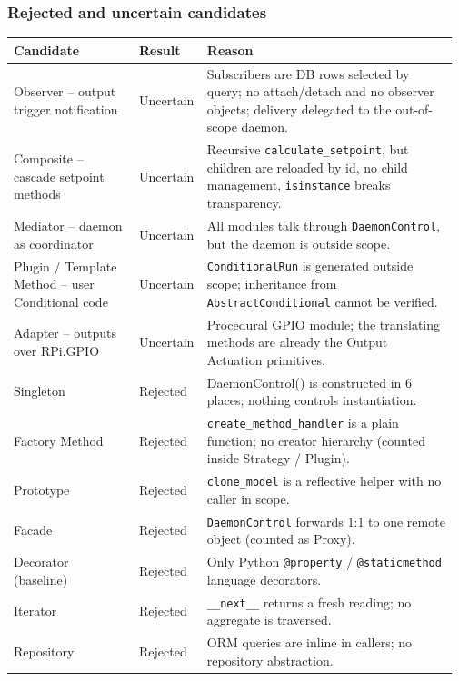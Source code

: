 \documentclass[11pt,a4paper]{article}
\begin{document}
\subsubsection*{Rejected and uncertain candidates}
{\small\setlength{\tabcolsep}{3pt}
\begin{longtable}{@{}P{0.29\linewidth}P{0.12\linewidth}P{0.56\linewidth}@{}}\toprule
\textbf{Candidate} & \textbf{Result} & \textbf{Reason} \\ \midrule\endhead
Observer -- output trigger notification & Uncertain & Subscribers are DB rows selected by query; no attach/detach and no observer objects; delivery delegated to the out-of-scope daemon. \\
Composite -- cascade setpoint methods & Uncertain & Recursive \texttt{calculate\_\allowbreak{}setpoint}, but children are reloaded by id, no child management, \texttt{isinstance} breaks transparency. \\
Mediator -- daemon as coordinator & Uncertain & All modules talk through \texttt{DaemonControl}, but the daemon is outside scope. \\
Plugin / Template Method -- user Conditional code & Uncertain & \texttt{ConditionalRun} is generated outside scope; inheritance from \texttt{AbstractConditional} cannot be verified. \\
Adapter -- outputs over RPi.GPIO & Uncertain & Procedural GPIO module; the translating methods are already the Output Actuation primitives. \\
Singleton & Rejected & DaemonControl() is constructed in 6 places; nothing controls instantiation. \\
Factory Method & Rejected & \texttt{create\_\allowbreak{}method\_\allowbreak{}handler} is a plain function; no creator hierarchy (counted inside Strategy / Plugin). \\
Prototype & Rejected & \texttt{clone\_\allowbreak{}model} is a reflective helper with no caller in scope. \\
Facade & Rejected & \texttt{DaemonControl} forwards 1:1 to one remote object (counted as Proxy). \\
Decorator (baseline) & Rejected & Only Python \texttt{@property} / \texttt{@staticmethod} language decorators. \\
Iterator & Rejected & \texttt{\_\allowbreak{}\_\allowbreak{}next\_\allowbreak{}\_\allowbreak{}} returns a fresh reading; no aggregate is traversed. \\
Repository & Rejected & ORM queries are inline in callers; no repository abstraction. \\

\end{longtable}}
\end{document}
